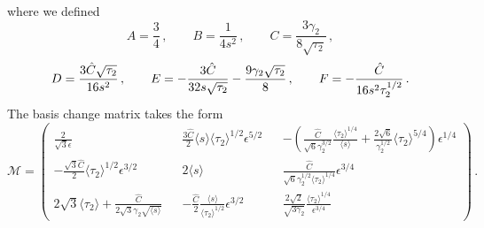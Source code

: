 \documentclass[11pt,a4paper]{article}
\begin{document}
where we defined
\begin{equation}
A = \frac{3}{4} \,, \qquad B = \frac{1}{4 s^2} \,, \qquad C =  \frac{3 \gamma_2}{8 \sqrt{\tau_2}} \,, \nonumber
\end{equation}
\begin{equation}
D = {3 \hat{C} \sqrt{\tau_2} \over 16 s^2} \,, \qquad E = -{3 \hat{C} \over 32  s \sqrt{\tau_2}} - \frac{9 \gamma_2 \sqrt{\tau_2}}{8} \,, \qquad F = -{\hat{C} \over 16 s^2 \tau_2^{1/2}} \,.
\end{equation}
The basis change matrix takes the form
\begin{equation}
\label{eq:RotationLoopEffects}
\mathcal{M} = 
\begin{pmatrix}
\frac{2}{\sqrt{3} \epsilon} && \frac{3 \hat{C}}{2} \langle s \rangle \langle \tau_2 \rangle^{1/2} \epsilon^{5/2} && - \left(\frac{\hat{C}}{\sqrt{6} \gamma_2^{3/2}} \frac{\langle\tau_2\rangle^{1/4}}{\langle s \rangle} + \frac{2 \sqrt{6}}{\gamma_2^{1/2}} \langle\tau_2\rangle^{5/4}\right) \epsilon^{1/4} \\
-\frac{\sqrt{3} \hat{C}}{2} \langle \tau_2 \rangle^{1/2} \epsilon^{3/2} && 2 \langle s \rangle && \frac{\hat{C}}{\sqrt{6} \gamma_2^{1/2} \langle \tau_2 \rangle^{1/4}} \epsilon^{3/4}\\
2 \sqrt{3} \langle\tau_2\rangle + \frac{\hat{C}}{2 \sqrt{3} \gamma_2 \sqrt{\langle s\rangle}} && -\frac{\hat{C}}{2} \frac{\langle s\rangle}{\langle \tau_2 \rangle^{1/2}} \epsilon^{3/2} && \frac{2 \sqrt{2}}{\sqrt{3 \gamma_2}} \frac{\langle \tau_2\rangle^{1/4}}{\epsilon^{3/4}}
\end{pmatrix}\,.
\end{equation}
\end{document}

